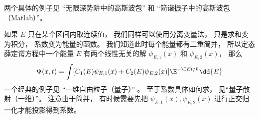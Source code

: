 两个具体的例子见 “无限深势阱中的高斯波包” 和 “简谐振子中的高斯波包（Matlab）”。

如果 $E$ 只在某个区间内取连续值， 我们同样可以使用分离变量法， 只是求和变为积分， 系数变为能量的函数。 我们知道此时每个能量都有二重简并， 所以定态薛定谔方程中一个能量 $E$ 有两个线性无关的解 $\psi_{E,1}(x)$ 和 $\psi_{E,2}(x)$， 那么
\begin{equation}\label{TDSE11_eq4}
\Psi(x, t) = \int [C_1(E) \psi_{E,1}(x) + C_2(E) \psi_{E,2}(x)] \E^{-\I E t/\hbar} \dd{E}
\end{equation}
一个经典的例子见 “一维自由粒子（量子）” 。 至于系数具体如何求， 见“量子散射（一维）”。 注意由于简并， 有时候需要先把 $\psi_{E,1}(x), \psi_{E,2}(x)$ 进行正交归一化才能投影得到系数。
